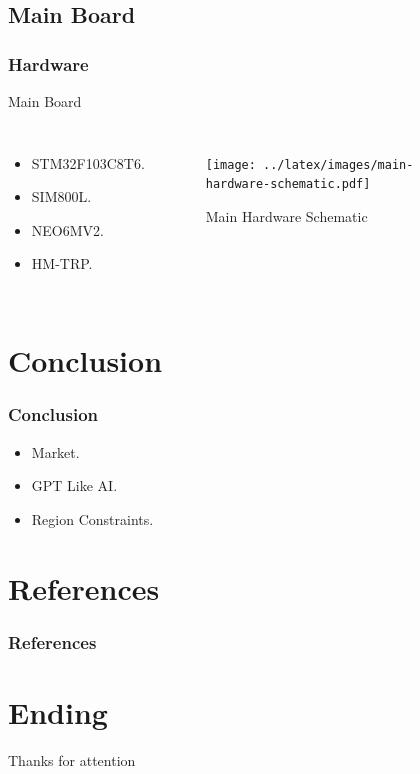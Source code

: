 \documentclass[aspectratio=169,11pt]{beamer}
\begin{document}
	\subsection{Main Board}
	\begin{frame}
		\frametitle{Hardware}
		\begin{block}{Main Board}
			\begin{columns}[c]
				\begin{itemize}
					\item STM32F103C8T6.
					\item SIM800L.
					\item NEO6MV2.
					\item HM-TRP.
				\end{itemize}
				\begin{figure}[!h]
					\centering
					\texttt{[image: ../latex/images/main-hardware-schematic.pdf]}
					\caption{Main Hardware Schematic}
				\end{figure}
			\end{columns}
		\end{block}
	\end{frame}

	\section{Conclusion}
	\begin{frame}
		\frametitle{Conclusion}
		\begin{itemize}
			\item Market.
			\item GPT Like AI.
			\item Region Constraints.
		\end{itemize}
	\end{frame}

	\section*{References}
	\begin{frame}
		\frametitle{References}
		\nocite{*}
		
		
	\end{frame}

	\section*{Ending}
	\begin{frame}
		\huge{\centerline{Thanks for attention}}
	\end{frame}
\end{document}
